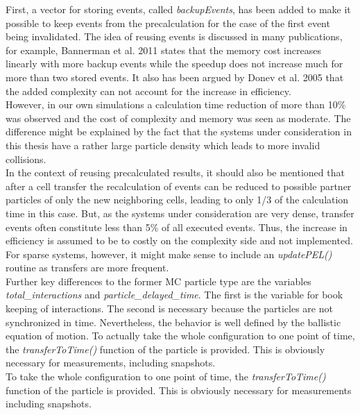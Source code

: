 First, a vector for storing events, called \textit{backupEvents}, has been added to make it possible to keep events from the precalculation for the case of the first event being invalidated. The idea of reusing events is discussed in many publications, for example, Bannerman et al. 2011\cite{Bannerman2011} states that the memory cost increases linearly with more backup events while the speedup does not increase much for more than two stored events. It also has been argued by Donev et al. 2005\cite{DONEV2005} that the added complexity can not account for the increase in efficiency.\\ 
However, in our own simulations a calculation time reduction of more than 10\% was observed and the cost of complexity and memory was seen as moderate. The difference might be explained by the fact that the systems under consideration in this thesis have a rather large particle density which leads to more invalid collisions.\\

In the context of reusing precalculated results, it should also be mentioned that after a cell transfer the recalculation of events can be reduced to possible partner particles of only the new neighboring cells, leading to only 1/3 of the calculation time in this case. But, as the systems under consideration are very dense, transfer events often constitute less than 5\% of all executed events. Thus, the increase in efficiency is assumed to be to costly on the complexity side and not implemented. For sparse systems, however, it might make sense to include an \textit{updatePEL()} routine as transfers are more frequent.\\

Further key differences to the former MC particle type are the variables \textit{total\_interactions} and \textit{particle\_delayed\_time}. The first is the variable for book keeping of interactions. The second is necessary because the particles are not synchronized in time. Nevertheless, the behavior is well defined by the ballistic equation of motion. To actually take the whole configuration to one point of time, the \textit{transferToTime()} function of the particle is provided. This is obviously necessary for measurements, including snapshots.\\


To take the whole configuration to one point of time, the \textit{transferToTime()} function of the particle is provided. This is obviously necessary for measurements including snapshots.\\

